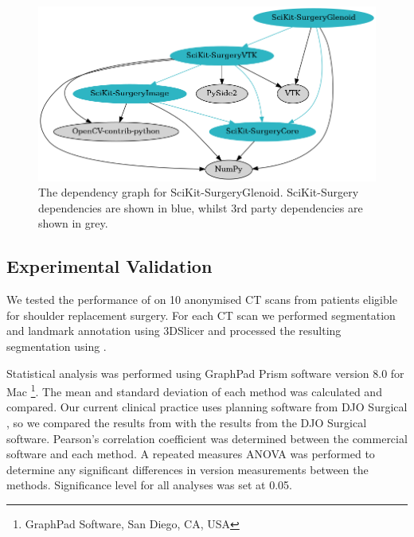 \begin{figure}
        \begin{center}
                \includegraphics[width=0.6\linewidth]{figures/dep_graph.png}
                        \caption{\label{fig:deps}The dependency graph for SciKit-SurgeryGlenoid. SciKit-Surgery dependencies are shown in blue, whilst 3rd party dependencies are shown in grey.}
        \end{center}
\end{figure}

\subsection{Experimental Validation}
We tested the performance of \sksglenoid on 10 anonymised {CT} scans from patients 
eligible for shoulder replacement surgery. For each {CT} scan we performed segmentation 
and landmark annotation using 3DSlicer \cite{Kikinis2014} and processed
the resulting 
segmentation using \sksglenoidns. 

Statistical analysis was performed using GraphPad Prism software version 8.0 for
Mac \footnote{GraphPad Software, San Diego, CA, USA}. The mean and standard deviation of 
each method was calculated and compared. Our current clinical practice uses planning 
software from {DJO} Surgical \cite{djosurgical}, so we compared the results from 
\sksglenoid with the results from the {DJO} Surgical software. 
Pearson’s correlation coefficient was 
determined between the commercial software and each method. 
A repeated measures ANOVA was performed to determine any significant differences
in version measurements between the methods. Significance level for all analyses was set at 0.05.

